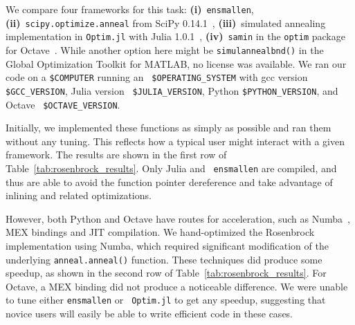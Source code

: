 \documentclass{article}
\begin{document}
We compare four frameworks for this task:
{\bf (i)}~{\tt ensmallen},
{\bf (ii)}~\texttt{\small scipy.optimize.anneal} from SciPy 0.14.1~\cite{jones2014scipy},
{\bf (iii)}~simulated annealing implementation in \texttt{\small Optim.jl} with Julia 1.0.1~\cite{mogensen2018optim},
{\bf (iv)}~\texttt{\small samin} in the \texttt{\small optim} package for Octave~\cite{octave}.
While another option here might be \texttt{\small simulannealbnd()} 
in the Global Optimization Toolkit for MATLAB,
no license was available.
We ran our code on a {\tt \$COMPUTER} running an {\tt
\$OPERATING\_SYSTEM} with gcc version {\tt \$GCC\_VERSION}, Julia version {\tt
\$JULIA\_VERSION}, Python {\tt \$PYTHON\_VERSION}, and Octave {\tt
\$OCTAVE\_VERSION}.

% 


Initially, we implemented these functions as simply as possible and ran them
without any tuning. This reflects how a typical user might interact with a
given framework.
The results are shown in the first row of
Table~\ref{tab:rosenbrock_results}.  Only Julia and {\tt
ensmallen} are compiled, and thus are able to avoid the function pointer
dereference and take advantage of inlining and related optimizations.

However, both Python and Octave have routes for acceleration,
such as Numba~\cite{lam2015numba}, MEX bindings and JIT compilation.
We hand-optimized the Rosenbrock implementation using Numba,
which required significant modification of the
underlying \texttt{\small anneal.anneal()} function.
These techniques did produce some speedup,
as shown in the second row of Table~\ref{tab:rosenbrock_results}.
For Octave, a MEX binding did not produce a noticeable difference.
We were unable to tune either \texttt{\small ensmallen} or \texttt{\small
Optim.jl} to get any speedup, suggesting that novice users will easily be able
to write efficient code in these cases.
\end{document}
